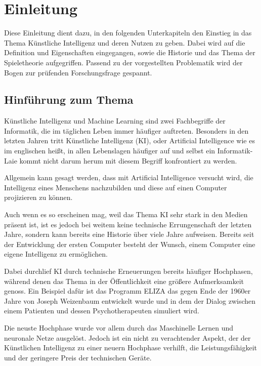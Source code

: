 
\chapter{Einleitung}
Diese Einleitung dient dazu, in den folgenden Unterkapiteln den Einstieg in das Thema Künstliche Intelligenz und deren Nutzen zu geben. Dabei wird auf die Definition und Eigenschaften eingegangen, sowie die Historie und das Thema der Spieletheorie aufgegriffen. Passend zu der vorgestellten Problematik wird der Bogen zur prüfenden Forschungsfrage gespannt.

\section{Hinführung zum Thema}
Künstliche Intelligenz und Machine Learning sind zwei Fachbegriffe der Informatik, die im täglichen Leben immer häufiger auftreten. Besonders in den letzten Jahren tritt Künstliche Intelligenz (\acs{KI}), oder Artificial Intelligence wie es im englischen heißt, in allen Lebenslagen häufiger auf und selbst ein Informatik-Laie kommt nicht darum herum mit diesem Begriff konfrontiert zu werden. 

Allgemein kann gesagt werden, dass mit Artificial Intelligence versucht wird, die Intelligenz eines Menschens nachzubilden und diese auf einen Computer projizieren zu können.

Auch wenn es so erscheinen mag, weil das Thema KI sehr stark in den Medien präsent ist, ist es jedoch bei weitem keine technische Errungenschaft der letzten Jahre, sondern kann bereits eine Historie über viele Jahre aufweisen. Bereits seit der Entwicklung der ersten Computer besteht der Wunsch, einem Computer eine eigene Intelligenz zu ermöglichen.

Dabei durchlief KI durch technische Erneuerungen bereits häufiger Hochphasen, während denen das Thema in der Öffentlichkeit eine größere Aufmerksamkeit genoss. Ein Beispiel dafür ist das Programm ELIZA das gegen Ende der 1960er Jahre von Joseph Weizenbaum entwickelt wurde und in dem der Dialog zwischen einem Patienten und dessen Psychotherapeuten simuliert wird.\cite{Weizenbaum1966}


Die neuste Hochphase wurde vor allem durch das Maschinelle Lernen und neuronale Netze ausgelöst. Jedoch ist ein nicht zu verachtender Aspekt, der der Künstlichen Intelligenz zu einer neuern Hochphase verhilft, die Leistungsfähigkeit und der geringere Preis der technischen Geräte. 

